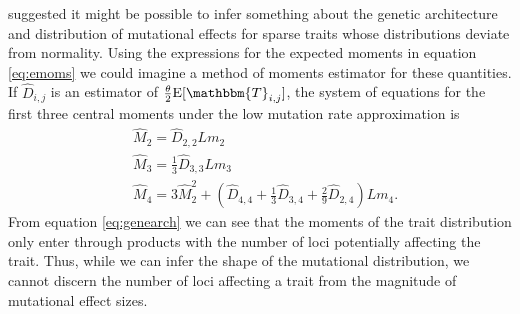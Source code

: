 \citet{Schraiber2015} suggested it might be possible to infer something about
the genetic architecture and distribution of mutational effects for sparse
traits whose distributions deviate from normality. Using the expressions for the
expected moments in equation \eqref{eq:emoms} we could imagine a method of
moments estimator for these quantities. If $\hat{D}_{i,j}$ is an estimator of
$\T \E[\mathbbm{T}_{i,j}]$, the system of equations for the first three central
moments under the low mutation rate approximation is
\begin{align}
\label{eq:genearch}
  &\hat{M}_2 = \hat{D}_{2,2}Lm_2 \nonumber \\
  &\hat{M}_3 = \frac{1}{3}\hat{D}_{3,3}Lm_3 \nonumber \\
  &\hat{M}_4 = 3\hat{M}_2^2 + (\hat{D}_{4,4} + \frac{1}{3} \hat{D}_{3,4} + \frac{2}{9} \hat{D}_{2,4})Lm_4.
\end{align}
From equation \eqref{eq:genearch} we can see that the moments of the trait
distribution only enter through products with the number of loci potentially
affecting the trait. Thus, while we can infer the shape of the mutational
distribution, we cannot discern the number of loci affecting a trait from the
magnitude of mutational effect sizes.

